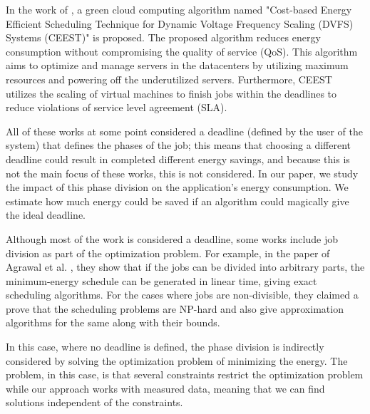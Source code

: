 
In the work of \cite{Ajmal2021}, a green cloud computing algorithm named "Cost-based Energy Efficient Scheduling Technique for Dynamic Voltage Frequency Scaling (DVFS) Systems (CEEST)" is proposed. The proposed algorithm reduces energy consumption without compromising the quality of service (QoS). This algorithm aims to optimize and manage servers in the datacenters by utilizing maximum resources and powering off the underutilized servers. Furthermore, CEEST utilizes the scaling of virtual machines to finish jobs within the deadlines to reduce violations of service level agreement (SLA). 

All of these works at some point considered a deadline (defined by the user of the system) that defines the phases of the job; this means that choosing a different deadline could result in completed different energy savings, and because this is not the main focus of these works, this is not considered. In our paper, we study the impact of this phase division on the application's energy consumption. We estimate how much energy could be saved if an algorithm could magically give the ideal deadline.

Although most of the work is considered a deadline, some works include job division as part of the optimization problem. For example, in the paper of Agrawal et al. \cite{Agrawal2021}, they show that if the jobs can be divided into arbitrary parts, the minimum-energy schedule can be generated in linear time, giving exact scheduling algorithms. For the cases where jobs are non-divisible, they claimed a prove that the scheduling problems are NP-hard and also give approximation algorithms for the same along with their bounds. 

In this case, where no deadline is defined, the phase division is indirectly considered by solving the optimization problem of minimizing the energy. The problem, in this case, is that several constraints restrict the optimization problem while our approach works with measured data, meaning that we can find solutions independent of the constraints.

